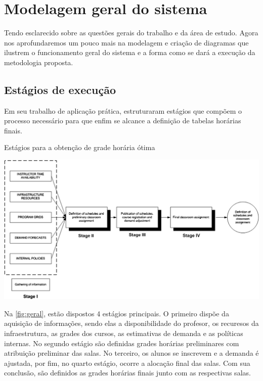 \chapter{Modelagem geral do sistema} \label{chap:modelagem} %

Tendo esclarecido sobre as questões gerais do trabalho e da área de estudo. Agora nos aprofundaremos um pouco mais na modelagem e criação de diagramas que ilustrem o funcionamento geral do sistema e a forma como se dará a execução da metodologia proposta.

\section{Estágios de execução} %

Em seu trabalho de aplicação prática,  estruturaram estágios que compõem o processo necessário para que enfim se alcance a definição de tabelas horárias finais.

\begin{CenteredFigure}
  \caption{Estágios para a obtenção de grade horária ótima}
  \label{fig:geral}
  \includegraphics[width=\textwidth]{files/img/2.02!4-modelagem/Arquitetura-UDP}
\end{CenteredFigure}

Na \autoref{fig:geral}, estão dispostos 4 estágios principais. O primeiro dispõe da aquisição de informações, sendo elas a disponibilidade do profesor, os recuresos da infraestrutura, as grades dos cursos, as estimativas de demanda e as políticas internas. No segundo estágio são definidas grades horárias preliminares com atribuição preliminar das salas. No terceiro, os alunos se inscrevem e a demanda é ajustada, por fim, no quarto estágio, ocorre a alocação final das salas. Com sua conclusão, são definidos as grades horárias finais junto com as respectivas salas.

